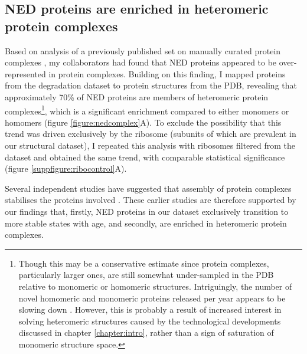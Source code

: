 \documentclass[a4paper,11pt,twoside,openright]{scrbook}
\begin{document}
\subsection{NED proteins are enriched in heteromeric protein complexes}
Based on analysis of a previously published set on manually curated protein complexes \cite{Ori2016}, my collaborators had found that NED proteins appeared to be over-represented in protein complexes. Building on this finding, I mapped proteins from the degradation dataset to protein structures from the PDB, revealing that approximately 70\% of NED proteins are members of heteromeric protein complexes\footnote{Though this may be a conservative estimate since protein complexes, particularly larger ones, are still somewhat under-sampled in the PDB relative to monomeric or homomeric structures. Intriguingly, the number of novel homomeric and monomeric proteins released per year appears to be slowing down \cite{Perica2012a,Marsh2015}. However, this is probably a result of increased interest in solving heteromeric structures caused by the technological developments discussed in chapter \ref{chapter:intro}, rather than a sign of saturation of monomeric structure space.}, which is a significant enrichment compared to either monomers or homomers (figure \ref{figure:nedcomplex}A). To exclude the possibility that this trend was driven exclusively by the ribosome (subunits of which are prevalent in our structural dataset), I repeated this analysis with ribosomes filtered from the dataset and obtained the same trend, with comparable statistical significance (figure \ref{suppfigure:ribocontrol}A).

Several independent studies have suggested that assembly of protein complexes stabilises the proteins involved \cite{Goldberg2003,Malinverni2006,Toyama2013}. These earlier studies are therefore supported by our findings that, firstly, NED proteins in our dataset exclusively transition to more stable states with age, and secondly, are enriched in heteromeric protein complexes.

\end{document}
